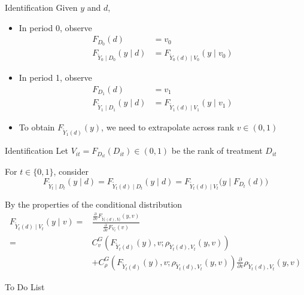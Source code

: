 \documentclass[aspectratio=1610, 9pt]{beamer}
\begin{document}
\begin{frame}{Identification}
Given $y$ and $d$,
\vspace{0.2cm}
\begin{itemize}
    \item In period 0, observe
    \begin{align*}
       F_{D_0}(d)&=v_0 \\
    F_{\tilde{Y}_0\mid D_0}(y\mid d)& = F_{\tilde{Y}_0(d)\mid V_0}(y\mid v_0)
    \end{align*}
 \item In period 1, observe   
 \begin{align*}
       F_{D_1}(d)&=v_1 \\
    F_{\tilde{Y}_1\mid D_1}(y\mid d)& = F_{\tilde{Y}_1(d)\mid V_1}(y\mid v_1)
    \end{align*}

    \item To obtain $F_{\tilde{Y}_1(d)}(y)$, we need to extrapolate across rank $v\in(0,1)$
\end{itemize}



\end{frame}



\begin{frame}{Identification}
Let $V_{it}=F_{D_{it}}(D_{it})\in (0,1)$ be the rank of treatment $D_{it}$


 For $t\in\{0,1\}$, consider 
 $$ F_{\tilde{Y}_{t}\mid D_{t}}(y\mid d)=F_{\tilde{Y}_{t}(d)\mid D_{t}}(y\mid d)=F_{\tilde{Y}_{t}(d)\mid V_{t}}\big(y\mid F_{D_{t}}(d)\big)$$
 
 By the properties of the conditional distribution 
 \begin{align*}
     F_{\tilde{Y}_{t}(d)\mid V_{t}}(y\mid v) =	&\frac{\frac{\partial}{\partial v}F_{\tilde{Y}_{t}(d),V_{t}}(y,v)}{\frac{\partial}{\partial v}F_{V_{t}}(v)}\\
=&	C_{v}^{G}\left(F_{\tilde{Y}_{t}(d)}(y),v;\rho_{\tilde{Y}_{t}(d),V_{t}}(y,v)\right)\\
	& + C_{\rho}^{G}\left(F_{\tilde{Y}_{t}(d)}(y),v;\rho_{\tilde{Y}_{t}(d),V_{t}}(y,v)\right)\frac{\partial}{\partial v}\rho_{\tilde{Y}_{t}(d),V_{t}}(y,v)
 \end{align*}
    
\end{frame}


\begin{frame}{To Do List}
    
\end{frame}
\end{document}
